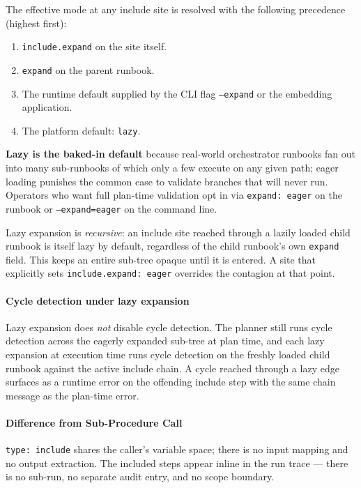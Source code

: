 The effective mode at any include site is resolved with the following
precedence (highest first):

\begin{enumerate}
  \item \texttt{include.expand} on the site itself.
  \item \texttt{expand} on the parent runbook.
  \item The runtime default supplied by the CLI flag \texttt{--expand} or the
        embedding application.
  \item The platform default: \texttt{lazy}.
\end{enumerate}

\textbf{Lazy is the baked-in default} because real-world orchestrator runbooks
fan out into many sub-runbooks of which only a few execute on any given path;
eager loading punishes the common case to validate branches that will never
run. Operators who want full plan-time validation opt in via
\texttt{expand: eager} on the runbook or \texttt{--expand=eager} on the
command line.

Lazy expansion is \emph{recursive}: an include site reached through a lazily
loaded child runbook is itself lazy by default, regardless of the child
runbook's own \texttt{expand} field. This keeps an entire sub-tree opaque
until it is entered. A site that explicitly sets \texttt{include.expand: eager}
overrides the contagion at that point.

\paragraph{Cycle detection under lazy expansion}
Lazy expansion does \emph{not} disable cycle detection. The planner still
runs cycle detection across the eagerly expanded sub-tree at plan time, and
each lazy expansion at execution time runs cycle detection on the freshly
loaded child runbook against the active include chain. A cycle reached
through a lazy edge surfaces as a runtime error on the offending include step
with the same chain message as the plan-time error.

\paragraph{Difference from Sub-Procedure Call}
\texttt{type: include} shares the caller's variable space; there is no input
mapping and no output extraction.  The included steps appear inline in the run
trace — there is no sub-run, no separate audit entry, and no scope boundary.

